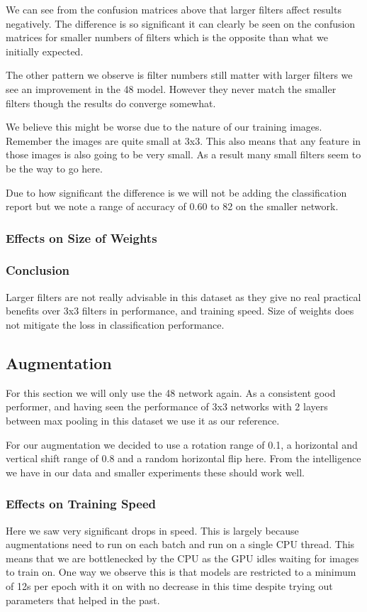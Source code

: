 We can see from the confusion matrices above that larger filters affect results negatively. The difference is so significant it can clearly be seen on the confusion matrices for smaller numbers of filters which is the opposite than what we initially expected.

The other pattern we observe is filter numbers still matter with larger filters we see an improvement in the 48 model. However they never match the smaller filters though the results do converge somewhat.

We believe this might be worse due to the nature of our training images. Remember the images are quite small at 3x3. This also means that any feature in those images is also going to be very small. As a result many small filters seem to be the way to go here.

Due to how significant the difference is we will not be adding the classification report but we note a range of accuracy of 0.60 to 82 on the smaller network.
\subsubsection{Effects on Size of Weights}

\subsubsection{Conclusion}
Larger filters are not really advisable in this dataset as they give no real practical benefits over 3x3 filters in performance, and training speed. Size of weights does not mitigate the loss in classification performance.

\subsection{Augmentation}
For this section we will only use the 48 network again. As a consistent good performer, and having seen the performance of 3x3 networks with 2 layers between max pooling in this dataset we use it as our reference.

For our augmentation we decided to use a rotation range of 0.1, a horizontal and vertical shift range of 0.8 and a random horizontal flip here. From the intelligence we have in our data and smaller experiments these should work well.
\subsubsection{Effects on Training Speed}
Here we saw very significant drops in speed. This is largely because augmentations need to run  on each batch and run on a single CPU thread. This means that we are bottlenecked by the CPU as the GPU idles waiting for images to train on. One way we observe this is that models are restricted to a minimum of 12s per epoch with it on with no decrease in this time despite trying out parameters that helped in the past.

